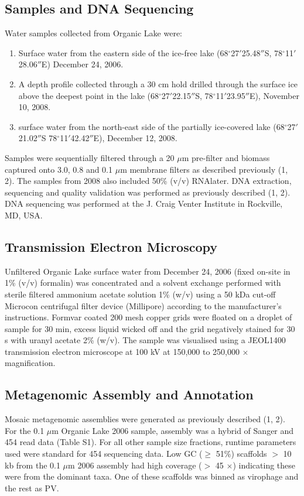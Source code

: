 \subsection{Samples and DNA Sequencing}
Water samples collected from Organic Lake were: 

\begin{enumerate}
\item Surface water from the eastern side of the ice-free lake (68$^{\circ}$27$'$25.48$''$S, 78$^{\circ}$11$'$28.06$''$E) December 24, 2006.
\item A depth profile collected through a 30 cm hold drilled through the surface ice above the deepest point in the lake (68$^{\circ}$27$'$22.15$''$S, 78$^{\circ}$11$'$23.95$''$E), November 10, 2008. 
\item surface water from the north-east side of the partially ice-covered lake (68$^{\circ}$27$'$21.02$''$S 78$^{\circ}$11$'$42.42$''$E), December 12, 2008. 
\end{enumerate}

Samples were sequentially filtered through a 20 $\mu$m pre-filter and biomass captured onto 3.0, 0.8 and 0.1 $\mu$m membrane filters as described previously (1, 2). 
The samples from 2008 also included 50\% (v/v) RNAlater. 
DNA extraction, sequencing and quality validation was performed as previously described (1, 2). 
DNA sequencing was performed at the J. Craig Venter Institute in Rockville, MD, USA.  

\subsection{Transmission Electron Microscopy}
Unfiltered Organic Lake surface water from December 24, 2006 (fixed on-site in 1\% (v/v) formalin) was concentrated and a solvent exchange performed with sterile filtered ammonium acetate solution 1\% (w/v) using a 50 kDa cut-off Microcon centrifugal filter device (Millipore) according to the manufacturer’s instructions. 
Formvar coated 200 mesh copper grids were floated on a droplet of sample for 30 min, excess liquid wicked off and the grid negatively stained for 30 s with uranyl acetate 2\% (w/v). 
The sample was visualised using a JEOL1400 transmission electron microscope at 100 kV at 150,000 to 250,000 $\times$ magnification.

\subsection{Metagenomic Assembly and Annotation}
Mosaic metagenomic assemblies were generated as previously described (1, 2). 
For the 0.1 $\mu$m Organic Lake 2006 sample, assembly was a hybrid of Sanger and 454 read data (Table S1). 
For all other sample size fractions, runtime parameters used were standard for 454 sequencing data. 
Low GC ($\ge$ 51\%) scaffolds $>$ 10 kb from the 0.1 $\mu$m 2006 assembly had high coverage ($>$ 45 $\times$) indicating these were from the dominant taxa. 
One of these scaffolds was binned as virophage and the rest as PV. 

